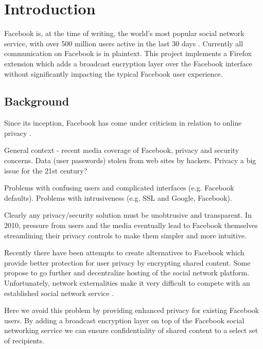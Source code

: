 \chapter{Introduction}\label{ch:introduction}

Facebook is, at the time of writing, the world's most popular social network service, with over 500 million users active in the last 30 days \cite{fb-factsheet}. Currently all communication on Facebook is in plaintext. This project implements a Firefox extension which adds a broadcast encryption layer over the Facebook interface without significantly impacting the typical Facebook user experience.

\section{Background}

Since its inception, Facebook has come under criticism in relation to online privacy \cite{fb-cipc}.

General context - recent media coverage of Facebook, privacy and security concerns. Data (user passwords) stolen from web sites by hackers. Privacy a big issue for the 21st century?
  
  
  
Problems with confusing users and complicated interfaces (e.g. Facebook defaults). Problems with intrusiveness (e.g. SSL and Google, Facebook).

 Clearly any privacy/security solution must be unobtrusive and transparent. In 2010, pressure from users and the media eventually lead to Facebook themselves streamlining their privacy controls \cite{fb-priv} to make them simpler and more intuitive.
  
  
Recently there have been attempts to create alternatives to Facebook \cite{pidder} which provide better protection for user privacy by encrypting shared content. Some propose to go further \cite{diaspora} and decentralize hosting of the social network platform. Unfortunately, network externalities make it very difficult to compete with an established social network service \cite{fb-network}. 

Here we avoid this problem by providing enhanced privacy for existing Facebook users. By adding a broadcast encryption layer on top of the Facebook social networking service we can ensure confidentiality of shared content to a select set of recipients.

